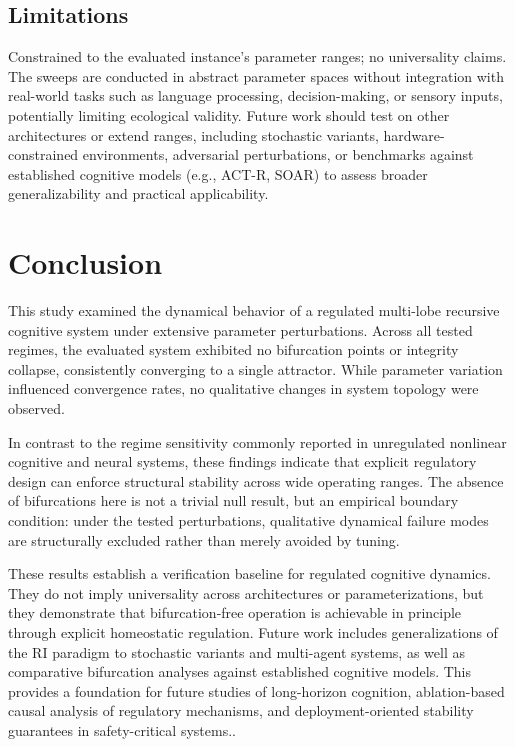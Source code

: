 \documentclass[11pt,a4paper]{article}
\begin{document}
\subsection{Limitations}

Constrained to the evaluated instance's parameter ranges; no universality claims. The sweeps are conducted in abstract parameter spaces without integration with real-world tasks such as language processing, decision-making, or sensory inputs, potentially limiting ecological validity. Future work should test on other architectures or extend ranges, including stochastic variants, hardware-constrained environments, adversarial perturbations, or benchmarks against established cognitive models (e.g., ACT-R, SOAR) to assess broader generalizability and practical applicability.

\section{Conclusion}

This study examined the dynamical behavior of a regulated multi-lobe recursive cognitive system under extensive parameter perturbations. Across all tested regimes, the evaluated system exhibited no bifurcation points or integrity collapse, consistently converging to a single attractor. While parameter variation influenced convergence rates, no qualitative changes in system topology were observed.

In contrast to the regime sensitivity commonly reported in unregulated nonlinear cognitive and neural systems, these findings indicate that explicit regulatory design can enforce structural stability across wide operating ranges. The absence of bifurcations here is not a trivial null result, but an empirical boundary condition: under the tested perturbations, qualitative dynamical failure modes are structurally excluded rather than merely avoided by tuning.

These results establish a verification baseline for regulated cognitive dynamics. They do not imply universality across architectures or parameterizations, but they demonstrate that bifurcation-free operation is achievable in principle through explicit homeostatic regulation. Future work includes generalizations of the RI paradigm to stochastic variants and multi-agent systems, as well as comparative bifurcation analyses against established cognitive models. This provides a foundation for future studies of long-horizon cognition, ablation-based causal analysis of regulatory mechanisms, and deployment-oriented stability guarantees in safety-critical systems..
\end{document}
